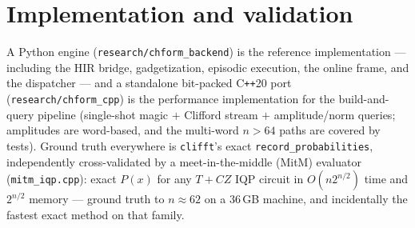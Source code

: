 \documentclass[11pt]{article}
\begin{document}
\section{Implementation and validation}\label{sec:impl}
A Python engine (\texttt{research/chform\_backend}) is the reference
implementation --- including the HIR bridge, gadgetization, episodic
execution, the online frame, and the dispatcher --- and a standalone
bit-packed C\texttt{++}20 port (\texttt{research/chform\_cpp}) is the
performance implementation for the build-and-query pipeline (single-shot
magic $+$ Clifford stream $+$ amplitude/norm queries; amplitudes are
word-based, and the multi-word $n>64$ paths are covered by tests). Ground
truth everywhere is \texttt{clifft}'s exact \texttt{record\_probabilities},
independently cross-validated by a meet-in-the-middle (MitM) evaluator
(\texttt{mitm\_iqp.cpp}): exact $P(x)$ for any $T{+}CZ$ IQP circuit in
$O(n2^{n/2})$ time and $2^{n/2}$ memory --- ground truth to $n\!\approx\!62$
on a $36$\,GB machine, and incidentally the fastest exact method on that
family.
\end{document}
